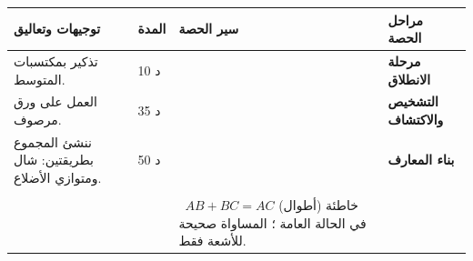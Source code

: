 \documentclass[12pt,a4paper]{article}
\newenvironment{LTR}{\begin{otherlanguage}{english}}{\end{otherlanguage}}
\newcommand{\ar}[1]{\foreignlanguage{arabic}{#1}}
\newcommand{\bx}[1]{\ensuremath{\colorbox{cDef!12}{$\displaystyle #1$}}}
\newcommand{\Phase}[1]{\textbf{#1}}
\newenvironment{Sayr}{%
\begin{LTR}\renewcommand{\arraystretch}{1.25}
\begin{longtable}{|p{0.17\textwidth}|>{\centering\arraybackslash}p{0.06\textwidth}|p{0.53\textwidth}|>{\centering\arraybackslash}p{0.12\textwidth}|}
\hline\rowcolor{cThm!12}\ar{\textbf{توجيهات وتعاليق}} & \ar{\textbf{المدة}} & \ar{\textbf{سير الحصة}} & \ar{\textbf{مراحل الحصة}}\\\hline\endhead
\hline\endfoot}{\end{longtable}\end{LTR}}
\newcommand{\Row}[4]{\ar{\small #4} & \ar{#3} & \ar{#2} & \cellcolor{cThm!8}\ar{\Phase{#1}}\\\hline}
\newcommand{\Lab}[2]{\foreignlanguage{english}{\tcbox[on line,colback=#1,colframe=#1,boxrule=0pt,arc=2pt,boxsep=1pt,left=5pt,right=5pt,top=1pt,bottom=1pt]{\ar{\textcolor{white}{\textbf{#2}}}}}}
\newcommand{\Num}[1]{\foreignlanguage{english}{\tikz[baseline=(c.base)]\node[fill=cDef,text=white,inner sep=2pt,font=\footnotesize\bfseries](c){#1};}}
\newcommand{\ck}{\ensuremath{{\color{cRem}\checkmark}}}
\begin{document}
\begin{Sayr}
\Row{مرحلة الانطلاق}{%
\textbf{التهيئة النفسية:} التذكير بالانسحاب.\par\Num{1} ما صورة النقطة $A$ بالانسحاب الذي يحوّل $C$ إلى $D$ ؟ \ \Num{2} ما خواص قطري متوازي الأضلاع؟}{10 د}{تذكير بمكتسبات المتوسط.}
\Row{التشخيص والاكتشاف}{%
\Lab{cEx}{مناقشة النشاطين 01 و 02 صفحة 252}\par\ck\ الشعاع $\overrightarrow{AB}$ يتميز بـ: \textbf{المنحى} (المستقيم $(AB)$) ، \textbf{الاتجاه} (من $A$ إلى $B$) ، \textbf{الطول} $AB$.\par
\ck\ شعاعان متساويان لهما نفس المنحى ونفس الاتجاه ونفس الطول.\par
\ck\ انسحاب بـ $\overrightarrow{AB}$ متبوع بانسحاب بـ $\overrightarrow{BC}$ يعطي انسحاباً بـ $\overrightarrow{AC}$.\par
}{35 د}{العمل على ورق مرصوف.}
\Row{بناء المعارف}{%
\Lab{cDef}{تعريف}\ $\overrightarrow{AB}=\overrightarrow{DC}$ معناه $ABCD$ متوازي أضلاع (قد يكون مسطحاً). \ الشعاع المعدوم: $\overrightarrow{AA}=\vec0$.\par\Lab{cThm}{علاقة شال}\ من أجل كل النقط $A$ ، $B$ ، $C$: \bx{\overrightarrow{AB}+\overrightarrow{BC}=\overrightarrow{AC}}.\par}{50 د}{ننشئ المجموع بطريقتين: شال ومتوازي الأضلاع.}
\Row{}{%
\Lab{cThm}{قاعدة متوازي الأضلاع}\ إذا كان $ABCD$ متوازي أضلاع فإن $\overrightarrow{AB}+\overrightarrow{AD}=\overrightarrow{AC}$.\par\smallskip\begin{LTR}\centering\begin{tikzpicture}[scale=0.75,font=\scriptsize,>=stealth]
\coordinate (A) at (0,0); \coordinate (B) at (3,0); \coordinate (C) at (4,1.8); \coordinate (D) at (1,1.8);
\draw[thick] (A)--(B)--(C)--(D)--cycle;
\draw[->,very thick,cDef] (A)--(B); \draw[->,very thick,cDef] (D)--(C);
\draw[->,very thick,cThm] (A)--(C);
\node[below left] at (A){$A$}; \node[below right] at (B){$B$}; \node[above right] at (C){$C$}; \node[above left] at (D){$D$};
\end{tikzpicture}\end{LTR}\par\Lab{cRem}{ملاحظات}\par\ck\ معاكس الشعاع $\overrightarrow{AB}$ هو $\overrightarrow{BA}$ ، و $\overrightarrow{AB}+\overrightarrow{BA}=\vec0$.\par
\ck\ $\overrightarrow{MA}-\overrightarrow{MB}=\overrightarrow{MA}+\overrightarrow{BM}=\overrightarrow{BA}$.\par
}{}{}
\Row{}{%
\Lab{cThm!80!black}{حذار}\ $AB+BC=AC$ (أطوال) خاطئة في الحالة العامة ؛ المساواة صحيحة للأشعة فقط.}{}{}

\end{Sayr}
\end{document}
